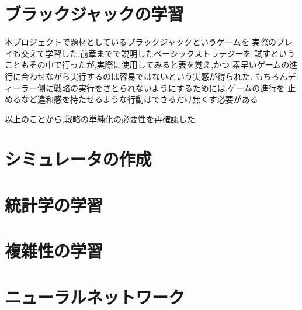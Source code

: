 \section{ブラックジャックの学習}
本プロジェクトで題材としているブラックジャックというゲームを
実際のプレイも交えて学習した.前章までで説明したベーシックストラテジーを
試すということもその中で行ったが,実際に使用してみると表を覚え,かつ
素早いゲームの進行に合わせながら実行するのは容易ではないという実感が得られた.
もちろんディーラー側に戦略の実行をさとられないようにするためには,ゲームの進行を
止めるなど違和感を持たせるような行動はできるだけ無くす必要がある.

以上のことから,戦略の単純化の必要性を再確認した.

\section{シミュレータの作成}


\section{統計学の学習}

\section{複雑性の学習}

\section{ニューラルネットワーク}